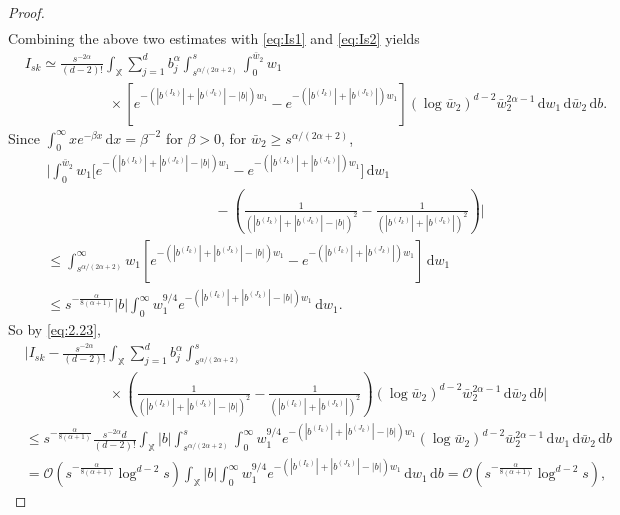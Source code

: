 \documentclass[11pt,reqno]{amsart}
\numberwithin{equation}{section}
\theoremstyle{definition}
\newcommand{\XX}{\mathbb{X}}
\newcommand{\diff}{{\,\mathrm d}}
\begin{document}
\begin{proof}
\begin{align*}
	\end{align*}
	Combining the above two estimates with \eqref{eq:Is1} and \eqref{eq:Is2} yields
	\begin{align}\label{eq:2.23}
		&I_{sk} \simeq \frac{s^{-2\alpha}}{(d-2)!} \int_{\XX } \sum_{j=1}^d b_j^{\alpha} \int_{s^{\alpha/(2\alpha+2)}}^s \int_{0}^{\bar w_2} w_1 \nonumber\\
		& \qquad \qquad \qquad \times \left[e^{-(|b^{(I_k)}| + |b^{(J_k)}|-|b|)w_1} - e^{-(|b^{(I_k)}| + |b^{(J_k)}|)w_1} \right] (\log \bar w_2)^{d-2}  \bar w_2^{2\alpha-1}  \diff w_1 \diff \bar w_2  \diff b.
	\end{align}
Since $\int_0^\infty xe^{-\beta x} \diff x=\beta^{-2}$ for $\beta>0$, for $\bar w_2 \ge s^{\alpha/(2\alpha+2)}$, 
\begin{align*}
	&\Bigg|\int_{0}^{\bar w_2} w_1 \Big[e^{-(|b^{(I_k)}| + |b^{(J_k)}|-|b|)w_1}- e^{-(|b^{(I_k)}| + |b^{(J_k)}|)w_1} \Big]  \diff w_1 \\
	& \qquad \qquad\qquad \qquad\qquad \qquad-\left(\frac{1}{(|b^{(I_k)}| + |b^{(J_k)}|-|b|)^{2}}  - \frac{1}{(|b^{(I_k)}| + |b^{(J_k)}|)^{2}}\right)\Bigg|\\
	& \le \int_{s^{\alpha/(2\alpha+2)}}^{\infty} w_1 \left[e^{-(|b^{(I_k)}| + |b^{(J_k)}|-|b|)w_1} - e^{-(|b^{(I_k)}| + |b^{(J_k)}|)w_1} \right]  \diff w_1\\
	& \le s^{-\frac{\alpha}{8(\alpha+1)}} |b| \int_{0}^{\infty} w_1^{9/4} e^{-(|b^{(I_k)}| + |b^{(J_k)}|-|b|)w_1}  \diff w_1.
\end{align*}
So by \eqref{eq:2.23},
\begin{align*}
	&\Big|I_{sk} - \frac{s^{-2\alpha}}{(d-2)!} \int_{\XX } \sum_{j=1}^d b_j^{\alpha} \int_{s^{\alpha/(2\alpha+2)}}^s  \nonumber\\
	& \qquad \qquad \qquad \times \left(\frac{1}{(|b^{(I_k)}| + |b^{(J_k)}|-|b|)^{2}}  - \frac{1}{(|b^{(I_k)}| + |b^{(J_k)}|)^{2}}\right) (\log \bar w_2)^{d-2}  \bar w_2^{2\alpha-1}  \diff \bar w_2  \diff b\Big|\\
	&\le s^{-\frac{\alpha}{8(\alpha+1)}}  \frac{s^{-2\alpha}d}{(d-2)!} \int_{\XX } |b| \int_{s^{\alpha/(2\alpha+2)}}^s \int_0^\infty w_1^{9/4} e^{-(|b^{(I_k)}| + |b^{(J_k)}|-|b|)w_1}  (\log \bar w_2)^{d-2}  \bar w_2^{2\alpha-1} \diff w_1 \diff \bar w_2  \diff b\\
	&=\mathcal{O}(s^{-\frac{\alpha}{8(\alpha+1)}} \log^{d-2} s)  \int_{\XX } |b| \int_0^\infty w_1^{9/4} e^{-(|b^{(I_k)}| + |b^{(J_k)}|-|b|)w_1}  \diff w_1  \diff b=\mathcal{O}(s^{-\frac{\alpha}{8(\alpha+1)}}  \log^{d-2} s),
\end{align*}

\end{proof}
\end{document}
